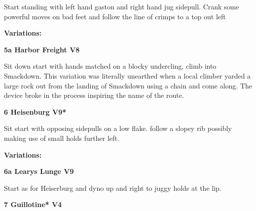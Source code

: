 \begin{multicols}{2}
\begin{minipage}{\linewidth}
					\begin{adjustwidth}{0.5cm}{}				
					Start standing with left hand gaston and right hand jug sidepull. Crank some powerful moves on bad feet and follow the line of crimps to a top out left
					\end{adjustwidth}
					\end{minipage}
						\begin{adjustwidth}{0.5cm}{}				
						\textbf{Variations:} \newline
							\begin{minipage}{\linewidth}	
							\label{vr:Harbor Freight}
\colorbox{Goldenrod!50}{
\parbox{0.95\textwidth}{
\textbf{
5a Harbor Freight V8     
}
}
}

							\begin{adjustwidth}{0.5cm}{}				
							Sit down start with hands matched on a blocky undercling, climb into Smackdown. This variation was literally unearthed when a local climber yarded a large rock out from the landing of Smackdown using a chain and come along. The device broke in the process inspiring the name of the route.
							\end{adjustwidth}
							\end{minipage}
						\end{adjustwidth}
					\begin{minipage}{\linewidth}	
					\label{rt:Heisenburg}
\colorbox{Goldenrod!50}{
\parbox{0.95\textwidth}{
\textbf{
6 Heisenburg V9*  
}
}
}

					\begin{adjustwidth}{0.5cm}{}				
					Sit start with opposing sidepulls on a low flake. follow a slopey rib possibly making use of small holds further left.
					\end{adjustwidth}
					\end{minipage}
						\begin{adjustwidth}{0.5cm}{}				
						\textbf{Variations:} \newline
							\begin{minipage}{\linewidth}	
							\label{vr:Learys Lunge}
\colorbox{Goldenrod!50}{
\parbox{0.95\textwidth}{
\textbf{
6a Learys Lunge V9     
}
}
}

							\begin{adjustwidth}{0.5cm}{}				
							Start as for Heiserburg and dyno up and right to juggy holds at the lip.
							\end{adjustwidth}
							\end{minipage}
						\end{adjustwidth}
					\begin{minipage}{\linewidth}	
					\label{rt:Guillotine}
\colorbox{RoyalBlue!20}{
\parbox{0.95\textwidth}{
\textbf{
7 Guillotine* V4    
}
}
}


\end{minipage}
\end{multicols}

